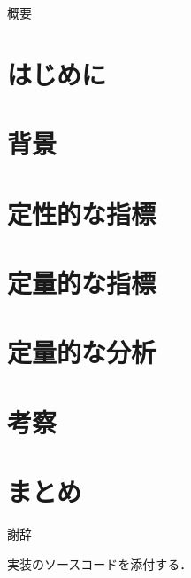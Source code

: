 \documentclass{kuisthesis}			%
\date{平成30年2月1日}				%
\begin{document}
\maketitle

\begin{jabstract}
概要
\end{jabstract}


\tableofcontents

\section{はじめに}\label{sec-intro}
\section{背景}
\section{定性的な指標}
\section{定量的な指標}
\section{定量的な分析}
\section{考察}
\section{まとめ}

\acknowledgments
謝辞




\Appendix[付録]
実装のソースコードを添付する．
\end{document}
